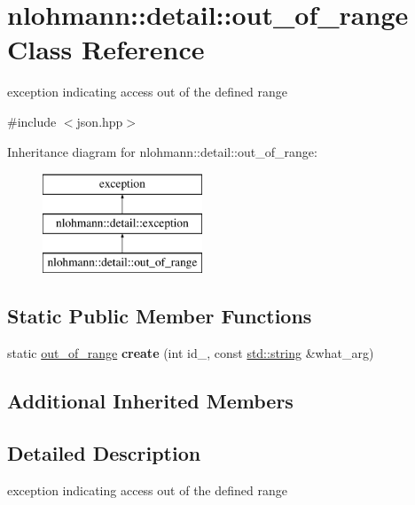 \hypertarget{classnlohmann_1_1detail_1_1out__of__range}{}\section{nlohmann\+:\+:detail\+:\+:out\+\_\+of\+\_\+range Class Reference}
\label{classnlohmann_1_1detail_1_1out__of__range}


exception indicating access out of the defined range  




{\ttfamily \#include $<$json.\+hpp$>$}

Inheritance diagram for nlohmann\+:\+:detail\+:\+:out\+\_\+of\+\_\+range\+:\begin{figure}[H]
\begin{center}
\leavevmode
\includegraphics[height=3.000000cm]{classnlohmann_1_1detail_1_1out__of__range}
\end{center}
\end{figure}
\subsection*{Static Public Member Functions}
\begin{DoxyCompactItemize}
\item 
\mbox{\label{classnlohmann_1_1detail_1_1out__of__range_a3f6d82a6f967c4728a1ec735a7867073}} 
static \mbox{\hyperlink{classnlohmann_1_1detail_1_1out__of__range}{out\+\_\+of\+\_\+range}} {\bfseries create} (int id\+\_\+, const \mbox{\hyperlink{namespacenlohmann_1_1detail_a1ed8fc6239da25abcaf681d30ace4985ab45cffe084dd3d20d928bee85e7b0f21}{std\+::string}} \&what\+\_\+arg)
\end{DoxyCompactItemize}
\subsection*{Additional Inherited Members}


\subsection{Detailed Description}
exception indicating access out of the defined range 

